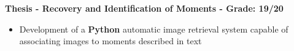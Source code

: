 

\textbf{Thesis - Recovery and Identification of Moments - Grade: 19/20}
\smallskip

\begin{itemize}
    \item Development of a \textbf{Python} automatic image retrieval system capable of associating images to moments described in text
\end{itemize}
